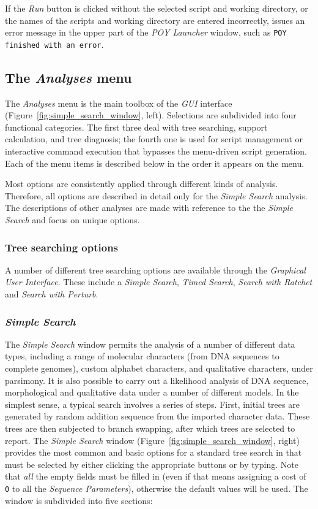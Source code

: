 If the \emph{Run} button is clicked without the selected script and
working directory, or the names of the scripts and working directory 
are entered incorrectly, \poy issues an error message in the upper part 
of the \emph{POY Launcher} window, such as \texttt{POY finished 
with an error}.

\subsection{The \emph{Analyses} menu}
The \emph{Analyses} menu is the main toolbox of the \poy \emph{GUI} 
interface (Figure~\ref{fig:simple_search_window}, left). Selections are 
subdivided into four functional categories. The first three deal with tree 
searching, support calculation, and tree diagnosis; the fourth one is used 
for  script management or interactive command execution that bypasses the 
menu-driven script generation. Each of the menu items is described below 
in the order it appears on the menu.

Most options are consistently applied through different kinds of analysis. 
Therefore, all options are described in detail only for the \emph{Simple Search} 
analysis. The descriptions of other analyses are made with reference to the the 
\emph{Simple Search} and focus on unique options.


\subsubsection{Tree searching options}

A number of different tree searching options are available through
the \emph{Graphical User Interface}.  These include a \emph{Simple
Search}, \emph{Timed Search}, \emph{Search with Ratchet} and
\emph{Search with Perturb}.

\subsubsection*{\emph{Simple Search}} 
The \emph{Simple Search}
window permits the analysis of a number of different data types,
including a range of molecular characters (from DNA sequences to
complete genomes), custom alphabet characters, and qualitative
characters, under parsimony.  It is also possible to carry out a
likelihood analysis of DNA sequence, morphological and qualitative
data under a number of different models.  In the simplest sense, a
typical search involves a series of steps.  First, initial trees
are generated by random addition sequence from the imported character
data.  These trees are then subjected to branch swapping, after
which trees are selected to report.  The \emph{Simple Search} window
(Figure~\ref{fig:simple_search_window}, right) provides the most
common and basic options for a standard tree search in \poy that
must be selected by either clicking the appropriate buttons or by
typing. Note that \emph{all} the empty fields must be filled in
(even if that means assigning a cost of \texttt{0} to all the
\emph{Sequence Parameters}), otherwise the default values will be
used. The window is subdivided into five sections: 


